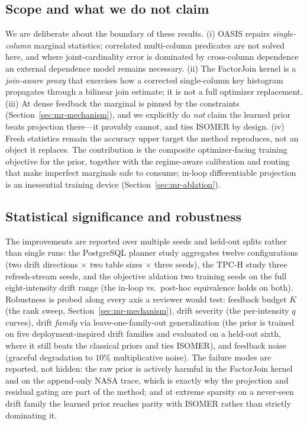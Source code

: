 \subsection{Scope and what we do not claim}
\label{sec:mr-scope}

We are deliberate about the boundary of these results. (i) OASIS repairs
\emph{single-column} marginal statistics; correlated multi-column predicates are
not solved here, and where joint-cardinality error is dominated by cross-column
dependence an external dependence model remains necessary. (ii) The FactorJoin
kernel is a \emph{join-aware proxy} that exercises how a corrected single-column
key histogram propagates through a bilinear join estimate; it is not a full
optimizer replacement. (iii) At dense feedback the marginal is pinned by the
constraints (Section~\ref{sec:mr-mechanism}), and we explicitly do \emph{not}
claim the learned prior beats projection there---it provably cannot, and ties
ISOMER by design. (iv) Fresh statistics remain the accuracy upper target the
method reproduces, not an object it replaces. The contribution is the
composite optimizer-facing training objective for the prior, together with the
regime-aware calibration and routing that make imperfect marginals safe to
consume; in-loop differentiable projection is an inessential training device
(Section~\ref{sec:mr-ablation}).

\subsection{Statistical significance and robustness}
\label{sec:mr-significance}

The improvements are reported over multiple seeds and held-out splits rather than
single runs: the PostgreSQL planner study aggregates twelve configurations
(two drift directions $\times$ two table sizes $\times$ three seeds), the TPC-H
study three refresh-stream seeds, and the objective ablation two training seeds
on the full eight-intensity drift range (the in-loop vs.\ post-hoc equivalence
holds on both). Robustness is probed along every axis a reviewer would test:
feedback budget $K$ (the rank sweep, Section~\ref{sec:mr-mechanism}), drift
severity (the per-intensity $q$ curves), drift \emph{family} via
leave-one-family-out generalization (the prior is trained on five
deployment-inspired drift families and evaluated on a held-out sixth, where it
still beats the classical priors and ties ISOMER), and feedback noise (graceful
degradation to $10\%$ multiplicative noise). The failure modes are reported, not
hidden: the raw prior is actively harmful in the FactorJoin kernel and on the
append-only NASA trace, which is exactly why the projection and residual gating
are part of the method; and at extreme sparsity on a never-seen drift family the
learned prior reaches parity with ISOMER rather than strictly dominating it.
